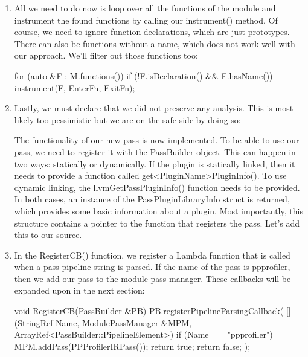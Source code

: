\begin{enumerate}
\item
All we need to do now is loop over all the functions of the module and instrument the found functions by calling our instrument() method. Of course, we need to ignore function declarations, which are just prototypes. There can also be functions without a name, which does not work well with our approach. We’ll filter out those functions too:

\begin{cpp}
    for (auto &F : M.functions()) {
        if (!F.isDeclaration() && F.hasName())
            instrument(F, EnterFn, ExitFn);
    }
\end{cpp}

\item
Lastly, we must declare that we did not preserve any analysis. This is most likely too pessimistic but we are on the safe side by doing so:

\begin{cpp}
    return PreservedAnalyses::none();
}
\end{cpp}

The functionality of our new pass is now implemented. To be able to use our pass, we need to register it with the PassBuilder object. This can happen in two ways: statically or dynamically. If the plugin is statically linked, then it needs to provide a function called get<PluginName>PluginInfo(). To use dynamic linking, the llvmGetPassPluginInfo() function needs to be provided. In both cases, an instance of the PassPluginLibraryInfo struct is returned, which provides some basic information about a plugin. Most importantly, this structure contains a pointer to the function that registers the pass. Let’s add this to our source.

\item
In the RegisterCB() function, we register a Lambda function that is called when a pass pipeline string is parsed. If the name of the pass is ppprofiler, then we add our pass to the module pass manager. These callbacks will be expanded upon in the next section:

\begin{cpp}
void RegisterCB(PassBuilder &PB) {
    PB.registerPipelineParsingCallback(
        [](StringRef Name, ModulePassManager &MPM,
           ArrayRef<PassBuilder::PipelineElement>) {
            if (Name == "ppprofiler") {
                MPM.addPass(PPProfilerIRPass());
                return true;
            }
            return false;
        });
}
\end{cpp}


\end{enumerate}
